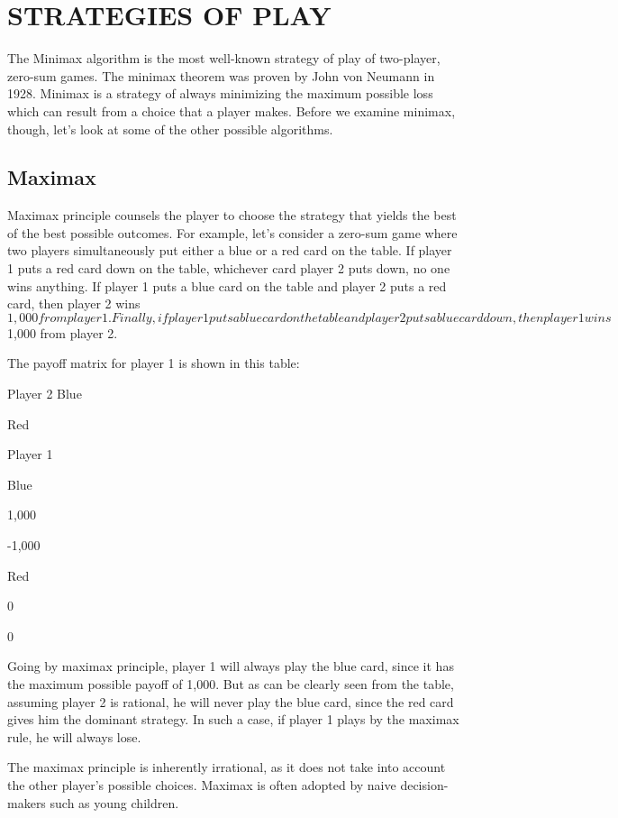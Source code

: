 
\section{STRATEGIES OF PLAY}
The Minimax algorithm is the most well-known strategy of play of two-player, zero-sum games. The minimax theorem was proven by John von Neumann in 1928. Minimax is a strategy of always minimizing the maximum possible loss which can result from a choice that a player makes. Before we examine minimax, though, let's look at some of the other possible algorithms.

\subsection{Maximax}

Maximax principle counsels the player to choose the strategy that yields the best of the best possible outcomes. For example, let's consider a zero-sum game where two players simultaneously put either a blue or a red card on the table. If player 1 puts a red card down on the table, whichever card player 2 puts down, no one wins anything. If player 1 puts a blue card on the table and player 2 puts a red card, then player 2 wins $1,000 from player 1. Finally, if player 1 puts a blue card on the table and player 2 puts a blue card down, then player 1 wins $1,000 from player 2.

The payoff matrix for player 1 is shown in this table:

Player 2
Blue

Red

Player 1  

Blue

1,000

-1,000

Red  

0

0

Going by maximax principle, player 1 will always play the blue card, since it has the maximum possible payoff of 1,000. But as can be clearly seen from the table, assuming player 2 is rational, he will never play the blue card, since the red card gives him the dominant strategy. In such a case, if player 1 plays by the maximax rule, he will always lose.

The maximax principle is inherently irrational, as it does not take into account the other player's possible choices. Maximax is often adopted by naive decision-makers such as young children.


